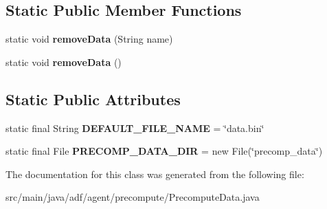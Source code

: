 \subsection*{Static Public Member Functions}
\begin{DoxyCompactItemize}
\item 
\hypertarget{classadf_1_1agent_1_1precompute_1_1PrecomputeData_a84d099f53a96c92491f7fe22ff609f3b}{}\label{classadf_1_1agent_1_1precompute_1_1PrecomputeData_a84d099f53a96c92491f7fe22ff609f3b} 
static void {\bfseries remove\+Data} (String name)
\item 
\hypertarget{classadf_1_1agent_1_1precompute_1_1PrecomputeData_a2e36ef1dba632b9dc1480e38a7c6a9e8}{}\label{classadf_1_1agent_1_1precompute_1_1PrecomputeData_a2e36ef1dba632b9dc1480e38a7c6a9e8} 
static void {\bfseries remove\+Data} ()
\end{DoxyCompactItemize}
\subsection*{Static Public Attributes}
\begin{DoxyCompactItemize}
\item 
\hypertarget{classadf_1_1agent_1_1precompute_1_1PrecomputeData_a5ddfa358838a988c4974cfe31fad115f}{}\label{classadf_1_1agent_1_1precompute_1_1PrecomputeData_a5ddfa358838a988c4974cfe31fad115f} 
static final String {\bfseries D\+E\+F\+A\+U\+L\+T\+\_\+\+F\+I\+L\+E\+\_\+\+N\+A\+ME} = \char`\"{}data.\+bin\char`\"{}
\item 
\hypertarget{classadf_1_1agent_1_1precompute_1_1PrecomputeData_aaf15e6515d8b927df7824b4ffa7d7319}{}\label{classadf_1_1agent_1_1precompute_1_1PrecomputeData_aaf15e6515d8b927df7824b4ffa7d7319} 
static final File {\bfseries P\+R\+E\+C\+O\+M\+P\+\_\+\+D\+A\+T\+A\+\_\+\+D\+IR} = new File(\char`\"{}precomp\+\_\+data\char`\"{})
\end{DoxyCompactItemize}


The documentation for this class was generated from the following file\+:\begin{DoxyCompactItemize}
\item 
src/main/java/adf/agent/precompute/Precompute\+Data.\+java\end{DoxyCompactItemize}
